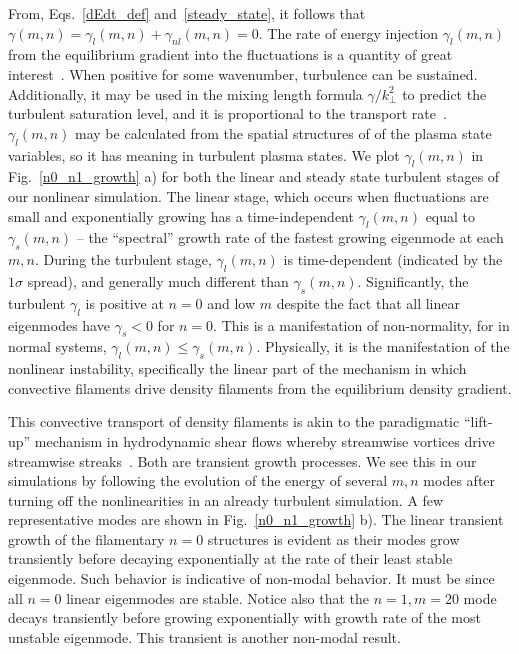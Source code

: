 \documentclass[letter,scriptaddress,twocolumn, prl,showkeys]{revtex4}
\begin{document}
From, Eqs.~\ref{dEdt_def} and~\ref{steady_state}, it follows that $ \gamma(m,n) = \gamma_l(m,n) + \gamma_{nl}(m,n) = 0$.
The rate of energy injection $\gamma_l(m,n)$ from the equilibrium gradient into the fluctuations is a quantity of great interest~\cite{friedman2012b,terry2006b}. 
When positive for some wavenumber, turbulence can be sustained. Additionally, it may be used in the mixing length formula $\gamma/k_\perp^2$ to predict the turbulent saturation level, 
and it is proportional to the transport rate~\cite{terry2006b}. 
$\gamma_l(m,n)$ may be calculated from the spatial structures of of the plasma state variables, so it has meaning in turbulent plasma states. We plot
$\gamma_l(m,n)$ in Fig.~\ref{n0_n1_growth} a) for both the linear and steady state turbulent stages of our nonlinear simulation. The linear stage, which occurs when fluctuations
are small and exponentially growing has a time-independent $\gamma_l(m,n)$ equal to $\gamma_s(m,n)$ -- the ``spectral'' growth rate of the fastest growing eigenmode at each $m,n$.
During the turbulent stage, $\gamma_l(m,n)$ is time-dependent (indicated by the $1 \sigma$ spread), and generally much different than $\gamma_s(m,n)$. Significantly,
the turbulent $\gamma_l$ is positive at $n=0$ and low $m$ despite the fact that all linear eigenmodes have $\gamma_s < 0$ for $n=0$. This is a manifestation
of non-normality, for in normal systems, $\gamma_l(m,n) \le \gamma_s(m,n)$. Physically, it is the manifestation of the nonlinear
instability, specifically the linear part of the mechanism in which convective filaments drive density filaments from the equilibrium density gradient.

This convective transport of density filaments is akin to the paradigmatic ``lift-up'' mechanism in hydrodynamic shear flows whereby streamwise vortices drive streamwise 
streaks~\cite{trefethen1993,krommes1999}.
Both are transient growth processes. We see this in our simulations by following the evolution of the energy of several $m,n$ modes after turning off the nonlinearities in an already
turbulent simulation. A few representative modes are shown in Fig.~\ref{n0_n1_growth} b). The linear transient growth of the filamentary $n=0$ structures is evident as their modes 
grow transiently before decaying exponentially at the rate of their least stable eigenmode. Such behavior is indicative of non-modal behavior. It must be since 
all $n=0$ linear eigenmodes are stable. Notice also that the $n=1,m=20$ mode decays transiently before growing exponentially with growth rate of the most unstable eigenmode. This transient
is another non-modal result.
\end{document}
